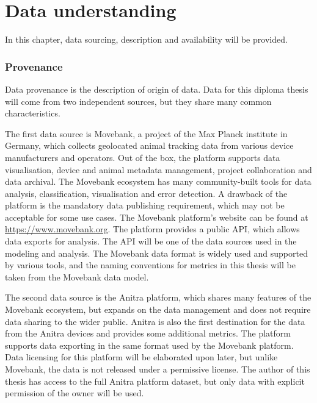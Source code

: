 
\chapter{Data understanding}


In this chapter, data sourcing, description and availability will be provided.


\subsection{Provenance}

Data provenance is the description of origin of data. Data for this diploma thesis will come from two independent sources, but they share many common characteristics.

The first data source is Movebank, a project of the Max Planck institute in Germany, which collects geolocated animal tracking data from various device manufacturers and operators. Out of the box, the platform supports data visualisation, device and animal metadata management, project collaboration and data archival. The Movebank ecosystem has many community-built tools for data analysis, classification, visualisation and error detection. A drawback of the platform is the mandatory data publishing requirement, which may not be acceptable for some use cases. The Movebank platform's website can be found at \url{https://www.movebank.org}. The platform provides a public API, which allows data exports for analysis. The API will be one of the data sources used in the modeling and analysis. The Movebank data format is widely used and supported by various tools, and the naming conventions for metrics in this thesis will be taken from the Movebank data model. %

The second data source is the Anitra platform, which shares many features of the Movebank ecosystem, but expands on the data management and does not require data sharing to the wider public. Anitra is also the first destination for the data from the Anitra devices and provides some additional metrics. The platform supports data exporting in the same format used by the Movebank platform. Data licensing for this platform will be elaborated upon later, but unlike Movebank, the data is not released under a permissive license. The author of this thesis has access to the full Anitra platform dataset, but only data with explicit permission of the owner will be used.

